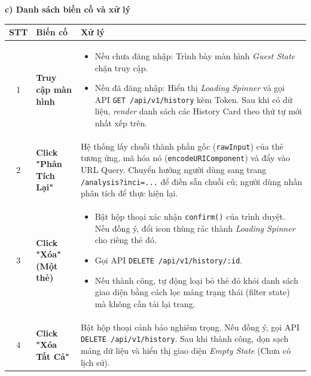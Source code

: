 \documentclass[12pt,a4paper]{article}
\begin{document}
\textbf{c) Danh sách biến cố và xử lý}

\begin{center}
\renewcommand{\arraystretch}{1.5}
\begin{tabularx}{\textwidth}{|c|l|X|}
\hline
\rowcolor{blue!20}
\textbf{STT} & \textbf{Biến cố} & \textbf{Xử lý} \\ \hline

1 & \textbf{Truy cập màn hình} & 
\begin{itemize}
    \item Nếu chưa đăng nhập: Trình bày màn hình \textit{Guest State} chặn truy cập.
    \item Nếu đã đăng nhập: Hiển thị \textit{Loading Spinner} và gọi API \texttt{GET /api/v1/history} kèm Token. Sau khi có dữ liệu, \textit{render} danh sách các History Card theo thứ tự mới nhất xếp trên.
\end{itemize} \\ \hline

2 & \textbf{Click "Phân Tích Lại"} & Hệ thống lấy chuỗi thành phần gốc (\texttt{rawInput}) của thẻ tương ứng, mã hóa nó (\texttt{encodeURIComponent}) và đẩy vào URL Query. Chuyển hướng người dùng sang trang \texttt{/analysis?inci=...} để điền sẵn chuỗi cũ; người dùng nhấn phân tích để thực hiện lại. \\ \hline

3 & \textbf{Click "Xóa" (Một thẻ)} & 
\begin{itemize}
    \item Bật hộp thoại xác nhận \texttt{confirm()} của trình duyệt. Nếu đồng ý, đổi icon thùng rác thành \textit{Loading Spinner} cho riêng thẻ đó.
    \item Gọi API \texttt{DELETE /api/v1/history/:id}. 
    \item Nếu thành công, tự động loại bỏ thẻ đó khỏi danh sách giao diện bằng cách lọc mảng trạng thái (filter state) mà không cần tải lại trang.
\end{itemize} \\ \hline

4 & \textbf{Click "Xóa Tất Cả"} & Bật hộp thoại cảnh báo nghiêm trọng. Nếu đồng ý, gọi API \texttt{DELETE /api/v1/history}. Sau khi thành công, dọn sạch mảng dữ liệu và hiển thị giao diện \textit{Empty State} (Chưa có lịch sử). \\ \hline

\end{tabularx}
\end{center}
\end{document}
